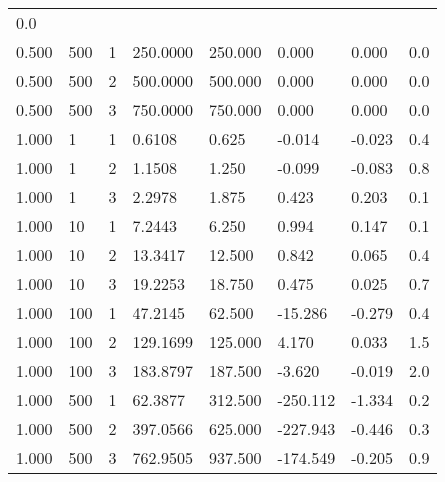 \documentclass{article}
\begin{document}
\begin{longtable}[]{@{}llllllll@{}}
0.0\tabularnewline
0.500 & 500 & 1 & 250.0000 & 250.000 & 0.000 & 0.000 &
0.0\tabularnewline
0.500 & 500 & 2 & 500.0000 & 500.000 & 0.000 & 0.000 &
0.0\tabularnewline
0.500 & 500 & 3 & 750.0000 & 750.000 & 0.000 & 0.000 &
0.0\tabularnewline
1.000 & 1 & 1 & 0.6108 & 0.625 & -0.014 & -0.023 & 0.4\tabularnewline
1.000 & 1 & 2 & 1.1508 & 1.250 & -0.099 & -0.083 & 0.8\tabularnewline
1.000 & 1 & 3 & 2.2978 & 1.875 & 0.423 & 0.203 & 0.1\tabularnewline
1.000 & 10 & 1 & 7.2443 & 6.250 & 0.994 & 0.147 & 0.1\tabularnewline
1.000 & 10 & 2 & 13.3417 & 12.500 & 0.842 & 0.065 & 0.4\tabularnewline
1.000 & 10 & 3 & 19.2253 & 18.750 & 0.475 & 0.025 & 0.7\tabularnewline
1.000 & 100 & 1 & 47.2145 & 62.500 & -15.286 & -0.279 &
0.4\tabularnewline
1.000 & 100 & 2 & 129.1699 & 125.000 & 4.170 & 0.033 &
1.5\tabularnewline
1.000 & 100 & 3 & 183.8797 & 187.500 & -3.620 & -0.019 &
2.0\tabularnewline
1.000 & 500 & 1 & 62.3877 & 312.500 & -250.112 & -1.334 &
0.2\tabularnewline
1.000 & 500 & 2 & 397.0566 & 625.000 & -227.943 & -0.446 &
0.3\tabularnewline
1.000 & 500 & 3 & 762.9505 & 937.500 & -174.549 & -0.205 &
0.9\tabularnewline
\bottomrule
\end{longtable}

\newpage
\end{document}
